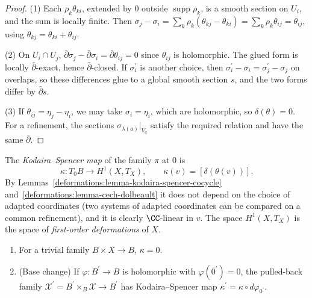 \begin{proof}
(1) Each $\rho_k\theta_{ki}$, extended by $0$ outside $\operatorname{supp}\rho_k$, is a smooth section on $U_i$, and the sum is locally finite. Then
$\sigma_j - \sigma_i = \sum_k\rho_k(\theta_{kj} - \theta_{ki}) = \sum_k\rho_k\theta_{ij} = \theta_{ij}$, using $\theta_{kj} = \theta_{ki} + \theta_{ij}$.

(2) On $U_i \cap U_j$, $\bar\partial\sigma_j - \bar\partial\sigma_i = \bar\partial\theta_{ij} = 0$ since $\theta_{ij}$ is holomorphic. The glued form is locally $\bar\partial$-exact, hence $\bar\partial$-closed. If $\sigma_i^{\prime}$ is another
choice, then $\sigma_i^{\prime} - \sigma_i = \sigma_j^{\prime} - \sigma_j$ on overlaps, so these differences glue to a global smooth section $s$, and the two forms differ by $\bar\partial s$.

(3) If $\theta_{ij} = \eta_j - \eta_i$, we may take $\sigma_i = \eta_i$, which are holomorphic, so $\delta(\theta) = 0$. For a refinement, the sections $\sigma_{\lambda(a)}|_{V_a}$ satisfy the required relation and
have the same $\bar\partial$.
\end{proof}

\begin{definition}\label{deformations:definition-kodaira-spencer}
The \emph{Kodaira--Spencer map} of the family $\pi$ at $0$ is
\[
\kappa \colon T_0B \to H^1(X, T_X), \qquad \kappa(v) = [\delta(\theta(v))].
\]
By Lemmas~\ref{deformations:lemma-kodaira-spencer-cocycle} and~\ref{deformations:lemma-cech-dolbeault} it does not depend on the choice of adapted coordinates (two systems of adapted coordinates
can be compared on a common refinement), and it is clearly $\CC$-linear in $v$. The space $H^1(X, T_X)$ is the space of \emph{first-order deformations} of $X$.
\end{definition}

\begin{proposition}\label{deformations:proposition-kodaira-spencer-properties}
\begin{enumerate}
\item For a trivial family $B \times X \to B$, $\kappa = 0$.
\item (Base change) If $\varphi \colon B^{\prime} \to B$ is holomorphic with $\varphi(0^{\prime}) = 0$, the pulled-back family $\mathcal{X}^{\prime} = B^{\prime} \times_B \mathcal{X} \to B^{\prime}$ has Kodaira--Spencer map
$\kappa^{\prime} = \kappa \circ d\varphi_{0^{\prime}}$.
\end{enumerate}
\end{proposition}

